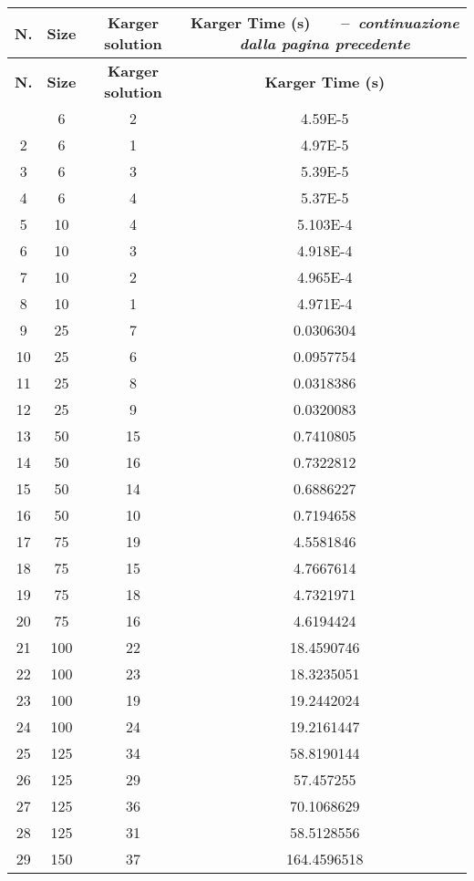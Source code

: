 \begin{center}
	\begin{longtable}{|c|c|c|c|}	
		\hline
		\textbf{N.} & \textbf{Size} & \textbf{Karger solution} & \textbf{Karger Time (s)}
		\endfirsthead
		{\tablename\ \thetable\ \ --\  \textit{continuazione dalla pagina precedente}} \\
		\hline
		\textbf{N.} & \textbf{Size} & \textbf{Karger solution} & \textbf{Karger Time (s)}
		\endhead
		\hline {\textit{Continua nella pagina seguente}} \\
		\endfoot  
		\endlastfoot
		\hline
		1 & 6 & 2 & 4.59E-5 \\
		2 & 6 & 1 & 4.97E-5 \\
		3 & 6 & 3 & 5.39E-5 \\
		4 & 6 & 4 & 5.37E-5 \\
		5 & 10 & 4 & 5.103E-4 \\
		6 & 10 & 3 & 4.918E-4 \\
		7 & 10 & 2 & 4.965E-4 \\
		8 & 10 & 1 & 4.971E-4 \\
		9 & 25 & 7 & 0.0306304 \\
		10 & 25 & 6 & 0.0957754 \\		
		11 & 25 & 8 & 0.0318386 \\		
		12 & 25 & 9 & 0.0320083 \\		
		13 & 50 & 15 & 0.7410805 \\		
		14 & 50 & 16 & 0.7322812 \\		
		15 & 50 & 14 & 0.6886227 \\		
		16 & 50 & 10 & 0.7194658 \\		 
		17 & 75 & 19 & 4.5581846 \\		
		18 & 75 & 15 & 4.7667614 \\		
		19 & 75 & 18 & 4.7321971 \\		
		20 & 75 & 16 & 4.6194424 \\		
		21 & 100 & 22 & 18.4590746 \\		
		22 & 100 & 23 & 18.3235051 \\		
		23 & 100 & 19 & 19.2442024 \\		
		24 & 100 & 24 & 19.2161447 \\		
		25 & 125 & 34 & 58.8190144 \\		
		26 & 125 & 29 & 57.457255 \\		
		27 & 125 & 36 & 70.1068629 \\		
		28 & 125 & 31 & 58.5128556 \\		
		29 & 150 & 37 & 164.4596518 \\		

\end{longtable}
\end{center}
